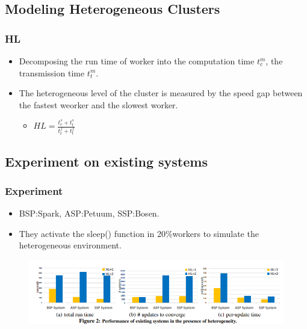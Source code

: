 \subsection{Modeling Heterogeneous Clusters}
\begin{frame}
    \frametitle{HL}
	\begin{itemize}
		\item Decomposing the run time of worker into the computation time $t_{c}^{m}$, the transmission time $t_{t}^{m}$.
		\item The heterogeneous level of the cluster is measured by the speed gap between the fastest weorker and the slowest worker.
			\begin{itemize}
				\item $HL = \frac{t_{c}^{s}+t_{t}^{s}}{t_{c}^{f}+t_{t}^{f}}\qquad$
			\end{itemize}
	\end{itemize} 
\end{frame}

\subsection{Experiment on existing systems}
\begin{frame}
    \frametitle{Experiment}
	\begin{itemize}
		\item BSP:Spark, ASP:Petuum, SSP:Bosen. 
		\item They activate the sleep() function in 20\%workers to simulate the heterogeneous environment. 
	\end{itemize}
	\begin{figure}
		\includegraphics[scale=0.4]{figure/experiment_exist.png}
	\end{figure}
\end{frame}


